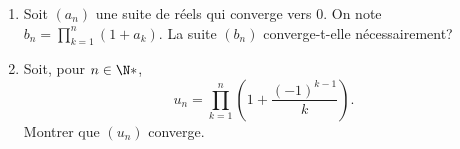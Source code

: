 \begin{enonce}
\begin{exercise}[ID={RMS126 E768},subtitle={Centrale PSI 2015},tags={}]
\begin{enumerate}
  \item Soit $(a_n)$ une suite de réels qui converge vers $0$.
    On note $b_n=\prod_{k=1}^{n} \left( 1+a_k \right)$.
    La suite $\left( b_n \right)$ converge-t-elle nécessairement?

  \item Soit, pour $n\in\N*$, 
    \begin{equation*}
      u_n = \prod_{k=1}^n \left( 1 + \frac{(-1)^{k-1}}{k} \right).
    \end{equation*}
    Montrer que $\left( u_n \right)$ converge.
\end{enumerate}
\end{exercise}
\begin{solution}
\end{solution}
\end{enonce}
